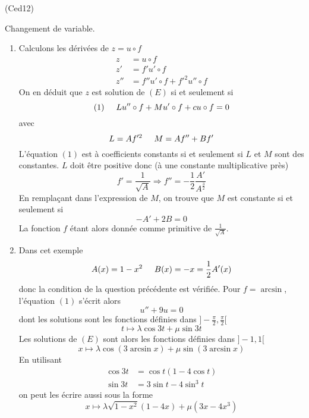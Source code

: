 \begin{tiny}(Ced12)\end{tiny} Changement de variable.
\begin{enumerate}
  \item Calculons les dérivées de $z = u\circ f$
\begin{align*}
  z &= u \circ f \\
  z' &= f' u'\circ f \\
  z'' &= f''u'\circ f + f'^2 u''\circ f
\end{align*}
On en déduit que $z$ est solution de $(E)$ si et seulement si 
\begin{displaymath}
  (1)\hspace{0.5cm} Lu''\circ f + Mu'\circ f + c u\circ f = 0
\end{displaymath}
avec
\begin{displaymath}
  L = A f'^2 \hspace{0.5cm}
  M = A f'' + Bf'
\end{displaymath}
L'équation $(1)$ est à coefficients constants si et seulement si $L$  et $M$ sont des constantes. $L$ doit être positive donc (à une constante multiplicative près)
\begin{displaymath}
  f' = \frac{1}{\sqrt{A}} \Rightarrow
  f'' = -\frac{1}{2}\frac{A'}{A^{\frac{3}{2}}}
\end{displaymath}
En remplaçant dans l'expression de $M$, on trouve que $M$ est constante si et seulement si 
\begin{displaymath}
  -A' + 2B = 0
\end{displaymath}
La fonction $f$ étant alors donnée comme primitive de $\frac{1}{\sqrt{A}}$.
\item Dans cet exemple 
\begin{displaymath}
A(x) = 1-x^2 \hspace{0.5cm} B(x)=-x = \frac{1}{2}A'(x)  
\end{displaymath}
donc la condition de la question précédente est vérifiée.\newline
Pour $f=\arcsin$, l'équation $(1)$ s'écrit alors
\begin{displaymath}
  u'' + 9u = 0
\end{displaymath}
dont les solutions sont les fonctions définies dans $]-\frac{\pi}{2}, \frac{\pi}{2}[$
\begin{displaymath}
  t\mapsto \lambda \cos3t + \mu \sin3t
\end{displaymath}
Les solutions de $(E)$ sont alors les fonctions définies dans $]-1,1[$
\begin{displaymath}
  x\mapsto \lambda \cos(3\arcsin x) + \mu \sin(3\arcsin x)
\end{displaymath}
En utilisant
\begin{align*}
\cos 3t &= \cos t(1-4\cos t)\\
\sin 3t &= 3\sin t - 4\sin^3 t
\end{align*}
on peut les écrire aussi sous la forme
\begin{displaymath}
  x\mapsto \lambda \sqrt{1-x^2}(1-4x) + \mu (3x-4x^3)
\end{displaymath}

\end{enumerate}
